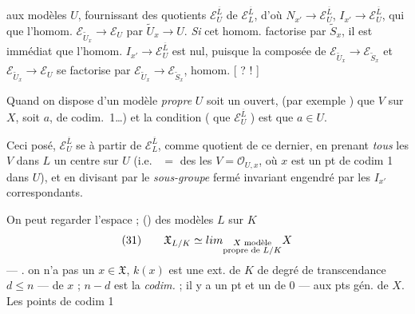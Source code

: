 \documentclass[11pt,a4paper]{article}
\begin{document}
 aux modèles $U$, fournissant
des quotients $\mathcal{E}^{\overline{L}}_{U}$ de $\mathcal{E}^{\overline{L}}_{L}$, d'où
$N_{x'} \to \mathcal{E}^{\overline{L}}_{U}$,  $I_{x'} \to \mathcal{E}^{\overline{L}}_{U}$,
 \ill{}
qui  que l'homom. \ill{} $\mathcal{E}_{\tilde{U}_x} \to \mathcal{E}_U$
 \ill{} par $\tilde{U}_x \to U$. \emph{Si} cet homom.
 factorise par $\tilde{S}_x$, il est immédiat
que l'homom.  $I_{x'} \to \mathcal{E}^{\overline{L}}_{U}$ est
nul, puisque \struck{\ill{}} la composée de
$\mathcal{E}_{\tilde{U}_x} \to \mathcal{E}_{\tilde{S}_x}$ et $\mathcal{E}_{\tilde{U}_x} \to \mathcal{E}_U$ se factorise par
$\mathcal{E}_{\tilde{U}_x} \to \mathcal{E}_{\tilde{S}_x}$, \ill{} homom. [  ?
\ill{} ! ]

Quand on dispose d'un
\struck{\ill{}} modèle \emph{propre}  $U$ soit un ouvert,
\struck{\ill{}} (par exemple \ill{} \ill{}
 \ill{} \ill{}) que $V$  \ill{}
\ill{} sur $X$, soit $a$,  
\ill{} de codim.\ 1…) et la condition
 \ill{} ( que
$\mathcal{E}^{\overline{L}}_{U}$  ) est  que $a \in U$.

Ceci posé, $\mathcal{E}^{\overline{L}}_{U}$ se  à partir
de $\mathcal{E}^{\overline{L}}_{L}$, comme  quotient de ce dernier,
en prenant \emph{tous} les $V$ dans $L$
 un centre sur $U$ (i.e.\  \ill{}
$=$ des  les $V = \mathcal{O}_{U,x}$, où $x$ est
un pt de codim 1 dans $U$), et en
divisant par le \emph{sous-groupe} fermé invariant
engendré par les $I_{x'}$ correspondants.

On peut regarder l'espace  \ill{} ;
()
\ill{} des modèles  $L$ sur $K$
\[
\text{(31)} \qquad \mathfrak{X}_{L/K} \simeq \varprojlim_{\substack{X \text{ modèle} \\ \text{propre de } L/K}} X
\]
 --- .  
\ill{} on n'a pas un
$x \in \mathfrak{X}$, $k(x)$ est une ext. de $K$ de
degré de transcendance $d \leq n$ --- \ill{} 
  de $x$ ; $n - d$ est la \emph{codim.} ; il y a un pt et un
 de  $0$ ---  aux pts
gén. de $X$. Les points de codim 1
\end{document}
